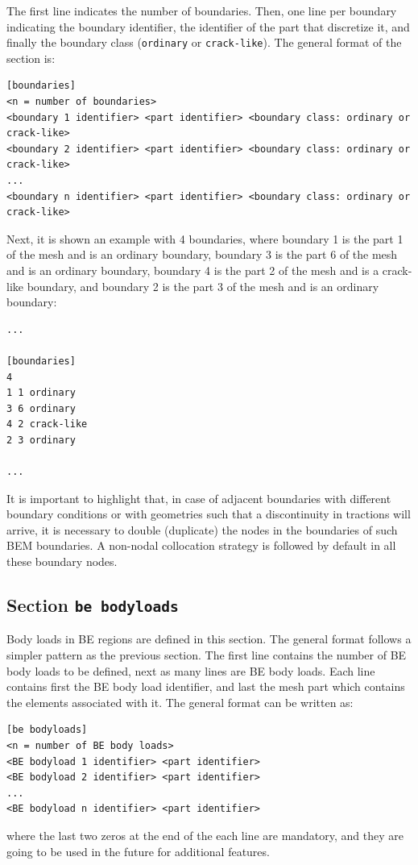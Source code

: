 \documentclass[a4paper,fleqn]{book}
\begin{document}
The first line indicates the number of boundaries. Then, one line per boundary indicating the boundary identifier, the identifier of the part that discretize it, and finally the boundary class (\texttt{ordinary} or \texttt{crack-like}). The general format of the section is:
\begin{Verbatim}[frame=single, fontsize=\small, label={general format of section [boundaries]}]
[boundaries]
<n = number of boundaries>
<boundary 1 identifier> <part identifier> <boundary class: ordinary or crack-like>
<boundary 2 identifier> <part identifier> <boundary class: ordinary or crack-like>
...
<boundary n identifier> <part identifier> <boundary class: ordinary or crack-like>
\end{Verbatim} 
Next, it is shown an example with 4 boundaries, where boundary 1 is the part 1 of the mesh and is an ordinary boundary, boundary 3 is the part 6 of the mesh and is an ordinary boundary, boundary 4 is the part 2 of the mesh and is a crack-like boundary, and boundary 2 is the part 3 of the mesh and is an ordinary boundary:
\begin{Verbatim}[frame=single, fontsize=\small, label=input.dat]
...

[boundaries]
4
1 1 ordinary 
3 6 ordinary
4 2 crack-like
2 3 ordinary

...
\end{Verbatim} 

It is important to highlight that, in case of adjacent boundaries with different boundary conditions or with geometries such that a discontinuity in tractions will arrive, it is necessary to double (duplicate) the nodes in the boundaries of such BEM boundaries. A non-nodal collocation strategy is followed by default in all these boundary nodes.

\subsection{Section \texttt{be bodyloads}}

Body loads in BE regions are defined in this section. The general format follows a simpler pattern as the previous section. The first line contains the number of BE body loads to be defined, next as many lines are BE body loads. Each line contains first the BE body load identifier, and last the mesh part which contains the elements associated with it. The general format can be written as:
\begin{Verbatim}[frame=single, fontsize=\small, label={general format of section [fe subregions]}]
[be bodyloads]
<n = number of BE body loads>
<BE bodyload 1 identifier> <part identifier>
<BE bodyload 2 identifier> <part identifier>
...
<BE bodyload n identifier> <part identifier>
\end{Verbatim}
where the last two zeros at the end of the each line are mandatory, and they are going to be used in the future for additional features.
\end{document}
